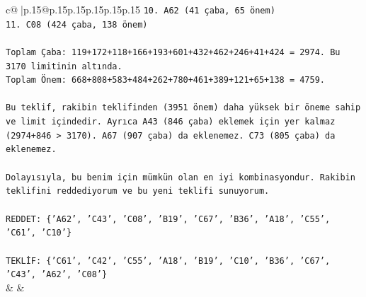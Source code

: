 \documentclass{article}
\begin{document}
{\begin{supertabular}{c@{$\;$}|p{.15\linewidth}@{}p{.15\linewidth}p{.15\linewidth}p{.15\linewidth}p{.15\linewidth}p{.15\linewidth}}
{{{\texttt{10. A62 (41 çaba, 65 önem)} \\
\texttt{11. C08 (424 çaba, 138 önem)} \\
\\ 
\texttt{Toplam Çaba: 119+172+118+166+193+601+432+462+246+41+424 = 2974. Bu 3170 limitinin altında.} \\
\texttt{Toplam Önem: 668+808+583+484+262+780+461+389+121+65+138 = 4759.} \\
\\ 
\texttt{Bu teklif, rakibin teklifinden (3951 önem) daha yüksek bir öneme sahip ve limit içindedir. Ayrıca A43 (846 çaba) eklemek için yer kalmaz (2974+846 > 3170). A67 (907 çaba) da eklenemez. C73 (805 çaba) da eklenemez.} \\
\\ 
\texttt{Dolayısıyla, bu benim için mümkün olan en iyi kombinasyondur. Rakibin teklifini reddediyorum ve bu yeni teklifi sunuyorum.} \\
\\ 
\texttt{REDDET: \{'A62', 'C43', 'C08', 'B19', 'C67', 'B36', 'A18', 'C55', 'C61', 'C10'\}} \\
\\ 
\texttt{TEKLİF: \{'C61', 'C42', 'C55', 'A18', 'B19', 'C10', 'B36', 'C67', 'C43', 'A62', 'C08'\}} \\
            }
        }
    }
    & & \\ \\


\end{supertabular}}
\end{document}
